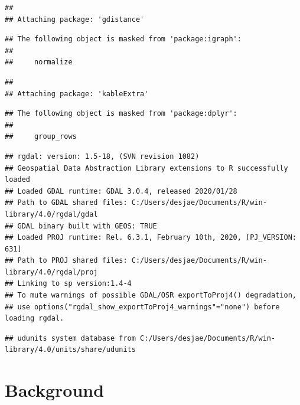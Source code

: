 \documentclass[]{elsarticle} %
\begin{document}
\begin{verbatim}
## 
## Attaching package: 'gdistance'
\end{verbatim}

\begin{verbatim}
## The following object is masked from 'package:igraph':
## 
##     normalize
\end{verbatim}

\begin{verbatim}
## 
## Attaching package: 'kableExtra'
\end{verbatim}

\begin{verbatim}
## The following object is masked from 'package:dplyr':
## 
##     group_rows
\end{verbatim}

\begin{verbatim}
## rgdal: version: 1.5-18, (SVN revision 1082)
## Geospatial Data Abstraction Library extensions to R successfully loaded
## Loaded GDAL runtime: GDAL 3.0.4, released 2020/01/28
## Path to GDAL shared files: C:/Users/desjae/Documents/R/win-library/4.0/rgdal/gdal
## GDAL binary built with GEOS: TRUE 
## Loaded PROJ runtime: Rel. 6.3.1, February 10th, 2020, [PJ_VERSION: 631]
## Path to PROJ shared files: C:/Users/desjae/Documents/R/win-library/4.0/rgdal/proj
## Linking to sp version:1.4-4
## To mute warnings of possible GDAL/OSR exportToProj4() degradation,
## use options("rgdal_show_exportToProj4_warnings"="none") before loading rgdal.
\end{verbatim}

\begin{verbatim}
## udunits system database from C:/Users/desjae/Documents/R/win-library/4.0/units/share/udunits
\end{verbatim}

\hypertarget{background}{%
\section{Background}\label{background}}
\end{document}
